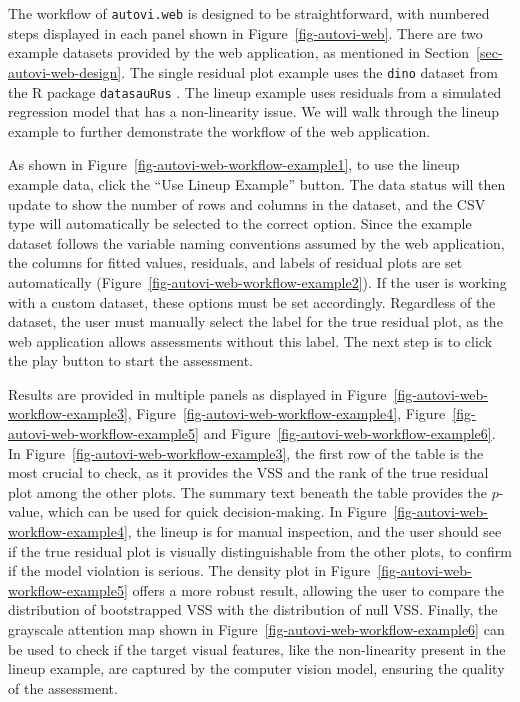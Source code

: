 \documentclass[
doublespace,
  times]{anzsauth}
\begin{document}
The workflow of \texttt{autovi.web} is designed to be straightforward,
with numbered steps displayed in each panel shown in
Figure~\ref{fig-autovi-web}. There are two example datasets provided by
the web application, as mentioned in
Section~\ref{sec-autovi-web-design}. The single residual plot example
uses the \texttt{dino} dataset from the R package \texttt{datasauRus}
\citep{datasaurus}. The lineup example uses residuals from a simulated
regression model that has a non-linearity issue. We will walk through
the lineup example to further demonstrate the workflow of the web
application.

As shown in Figure~\ref{fig-autovi-web-workflow-example1}, to use the
lineup example data, click the ``Use Lineup Example'' button. The data
status will then update to show the number of rows and columns in the
dataset, and the CSV type will automatically be selected to the correct
option. Since the example dataset follows the variable naming
conventions assumed by the web application, the columns for fitted
values, residuals, and labels of residual plots are set automatically
(Figure~\ref{fig-autovi-web-workflow-example2}). If the user is working
with a custom dataset, these options must be set accordingly. Regardless
of the dataset, the user must manually select the label for the true
residual plot, as the web application allows assessments without this
label. The next step is to click the play button to start the
assessment.

Results are provided in multiple panels as displayed in
Figure~\ref{fig-autovi-web-workflow-example3},
Figure~\ref{fig-autovi-web-workflow-example4},
Figure~\ref{fig-autovi-web-workflow-example5} and
Figure~\ref{fig-autovi-web-workflow-example6}. In
Figure~\ref{fig-autovi-web-workflow-example3}, the first row of the
table is the most crucial to check, as it provides the VSS and the rank
of the true residual plot among the other plots. The summary text
beneath the table provides the \(p\)-value, which can be used for quick
decision-making. In Figure~\ref{fig-autovi-web-workflow-example4}, the
lineup is for manual inspection, and the user should see if the true
residual plot is visually distinguishable from the other plots, to
confirm if the model violation is serious. The density plot in
Figure~\ref{fig-autovi-web-workflow-example5} offers a more robust
result, allowing the user to compare the distribution of bootstrapped
VSS with the distribution of null VSS. Finally, the grayscale attention
map shown in Figure~\ref{fig-autovi-web-workflow-example6} can be used
to check if the target visual features, like the non-linearity present
in the lineup example, are captured by the computer vision model,
ensuring the quality of the assessment.
\end{document}
